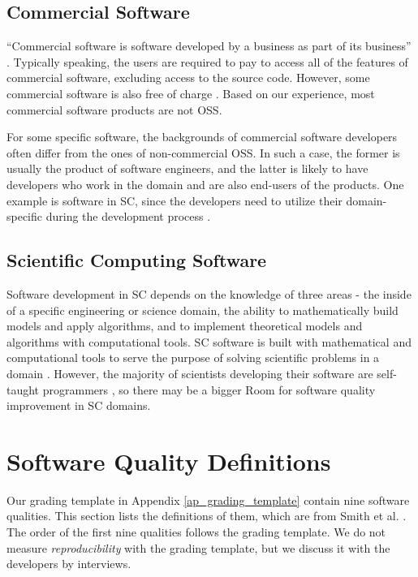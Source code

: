 \subsection{Commercial Software}
``Commercial software is software developed by a business as part of its business'' \cite{GNU2019}.
Typically speaking, the users are required to pay to access all of the features of commercial software, excluding access to the source code. However, some commercial software is also free of charge \cite{GNU2019}. Based on our experience, most commercial software products are not OSS.

For some specific software, the backgrounds of commercial software developers often differ from the ones of non-commercial OSS. In such a case, the former is usually the product of software engineers, and the latter is likely to have developers who work in the domain and are also end-users of the products. One example is software in SC, since the developers need to utilize their domain-specific during the development process \cite{WilsonEtAl2014}.

\subsection{Scientific Computing Software}
Software development in SC depends on the knowledge of three areas - the inside of a specific engineering or science domain, the ability to mathematically build models and apply algorithms, and to implement theoretical models and algorithms with computational tools. SC software is built with mathematical and computational tools to serve the purpose of solving scientific problems in a domain \cite{Mehta2015}. However, the majority of scientists developing their software are self-taught programmers \cite{WilsonEtAl2014}, so there may be a bigger Room for software quality improvement in SC domains.

\section{Software Quality Definitions}
\label{sec_software_quality}

Our grading template in Appendix \ref{ap_grading_template} contain nine software qualities. This section lists the definitions of them, which are from Smith et al. \cite{SmithEtAl2020}. The order of the first nine qualities follows the grading template. We do not measure \textit{reproducibility} with the grading template, but we discuss it with the developers by interviews.

